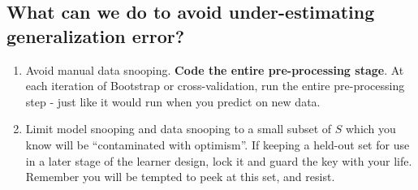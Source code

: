 \documentclass[11pt]{article}
\begin{document}
\subsection{What can we do to avoid under-estimating generalization error?}

\begin{enumerate}
  \item Avoid manual data snooping. {\bf Code the entire pre-processing stage}.
    At each iteration of Bootstrap or cross-validation, run the entire
    pre-processing step - just like it would run when you predict on new data.
  \item Limit model snooping and data snooping to a small subset of $S$ which
    you know will be ``contaminated with optimism''. If keeping a held-out set
    for use in a later stage of the learner design, lock it and guard the key
    with your life. Remember you will be tempted to peek at this set, and
    resist. 
\end{enumerate}
\end{document}
